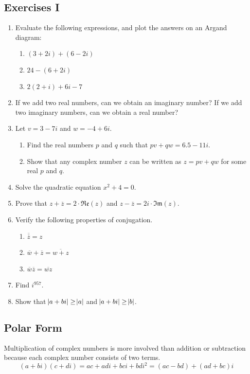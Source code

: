 \documentclass[a4paper,10pt,titlepage]{article}
\theoremstyle{definition}
\newcommand*\realp[1]{ \mathfrak{Re} \left ( {#1} \right )  }
\newcommand*\imagp[1]{ \mathfrak{Im} \left ( {#1} \right )  }
\begin{document}
\subsection*{Exercises I}
\begin{enumerate}
  \item Evaluate the following expressions, and plot the answers on an Argand diagram:
        \begin{enumerate}
          \item $ (3+2i) + (6-2i) $
          \item $ 24 - (6 + 2i) $
          \item $ 2(2+i) + 6i - 7 $
        \end{enumerate}
  \item If we add two real numbers, can we obtain an imaginary number? If we add two
        imaginary numbers, can we obtain a real number?
  \item Let $ v = 3-7i $ and $ w = -4+6i $.
    \begin{enumerate}
      \item Find the real numbers $ p $ and $ q $ such that $ pv + qw = 6.5 - 11i $.
      \item Show that any complex number $ z $ can be written as $ z = pv + qw $ for some real $ p $ and $ q $.
    \end{enumerate}
  \item Solve the quadratic equation $ x^2 + 4 = 0 $.
  \item Prove that $ z + \overline z = 2 \cdot \realp{z} $ and $ z - \overline z = 2i \cdot \imagp{z} $.
  \item Verify the following properties of conjugation.
    \begin{enumerate}
      \item $ \overline {\overline z} = z $
      \item $ \overline w + \overline z = \overline{w + z} $
      \item $ \overline w \overline z = \overline{wz} $
    \end{enumerate}
  \item Find $ i^{957} $.
  \item Show that $ \abs{a + bi} \geq \abs{a} $ and $ \abs{a + bi} \geq \abs{b} $.
\end{enumerate}

\subsection*{Polar Form}
Multiplication of complex numbers is more involved than addition or subtraction
because each complex number consists of two terms.
\begin{displaymath}
  (a+bi)(c+di) = ac + adi + bci + bdi^2 = (ac - bd) + (ad + bc)i
\end{displaymath}
\end{document}

